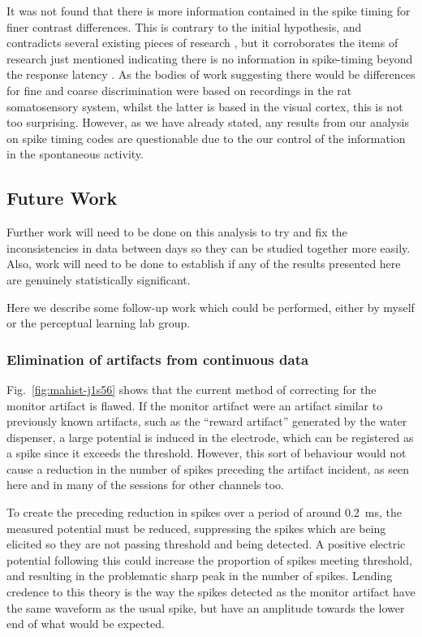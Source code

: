 It was not found that there is more information contained in the spike timing for finer contrast differences.
This is contrary to the initial hypothesis, and contradicts several existing pieces of research \cite{Reich2001,Arabzadeh2006}, but it corroborates the items of research just mentioned indicating there is no information in spike-timing beyond the response latency \cite{Reich2001,Tovee1993,Rolls2011}.
As the bodies of work suggesting there would be differences for fine and coarse discrimination were based on recordings in the rat somatosensory system, whilst the latter is based in the visual cortex, this is not too surprising.
However, as we have already stated, any results from our analysis on spike timing codes are questionable due to the our control of the information in the spontaneous activity.

\subsection{Future Work}

Further work will need to be done on this analysis to try and fix the inconsistencies in data between days so they can be studied together more easily.
Also, work will need to be done to establish if any of the results presented here are genuinely statistically significant.

Here we describe some follow-up work which could be performed, either by myself or the perceptual learning lab group.

\subsubsection{Elimination of artifacts from continuous data}

Fig.~\ref{fig:mahist-j1s56} shows that the current method of correcting for the monitor artifact is flawed.
If the monitor artifact were an artifact similar to previously known artifacts, such as the ``reward artifact'' generated by the water dispenser, a large potential is induced in the electrode, which can be registered as a spike since it exceeds the threshold.
However, this sort of behaviour would not cause a reduction in the number of spikes preceding the artifact incident, as seen here and in many of the sessions for other channels too.

To create the preceding reduction in spikes over a period of around \SI{0.2}{ms}, the measured potential must be reduced, suppressing the spikes which are being elicited so they are not passing threshold and being detected.
A positive electric potential following this could increase the proportion of spikes meeting threshold, and resulting in the problematic sharp peak in the number of spikes.
Lending credence to this theory is the way the spikes detected as the monitor artifact have the same waveform as the usual spike, but have an amplitude towards the lower end of what would be expected.

